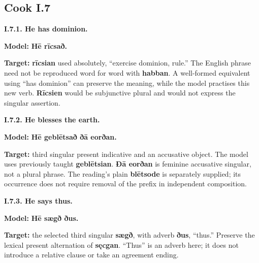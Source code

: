 \subsection*{Cook I.7}

\par\begin{minipage}{\linewidth}\raggedright
\textbf{I.7.1. He has dominion.}

\textbf{Model:} \textbf{Hē rīcsað.}

\textbf{Target:} \textbf{rīcsian} used absolutely, “exercise dominion, rule.” The English phrase need not be reproduced word for word with \textbf{habban}. A well-formed equivalent using “has dominion” can preserve the meaning, while the model practises this new verb. \textbf{Rīcsien} would be subjunctive plural and would not express the singular assertion.

\end{minipage}\par\addvspace{4pt}

\par\begin{minipage}{\linewidth}\raggedright
\textbf{I.7.2. He blesses the earth.}

\textbf{Model:} \textbf{Hē geblētsað ðā eorðan.}

\textbf{Target:} third singular present indicative and an accusative object. The model uses previously taught \textbf{geblētsian}. \textbf{Ðā eorðan} is feminine accusative singular, not a plural phrase. The reading’s plain \textbf{blētsode} is separately supplied; its occurrence does not require removal of the prefix in independent composition.

\end{minipage}\par\addvspace{4pt}

\par\begin{minipage}{\linewidth}\raggedright
\textbf{I.7.3. He says thus.}

\textbf{Model:} \textbf{Hē sægð ðus.}

\textbf{Target:} the selected third singular \textbf{sægð}, with adverb \textbf{ðus}, “thus.” Preserve the lexical present alternation of \textbf{sęcgan}. “Thus” is an adverb here; it does not introduce a relative clause or take an agreement ending.

\end{minipage}\par\addvspace{4pt}

